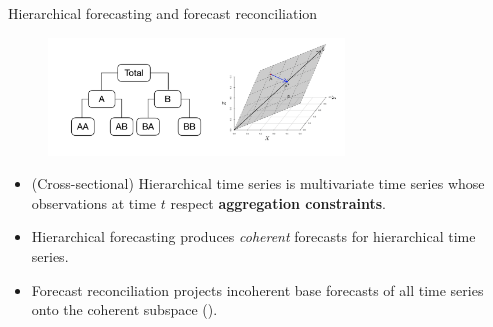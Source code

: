 \documentclass[aspectratio=169]{beamer}
\begin{document}
\begin{frame}{Hierarchical forecasting and forecast reconciliation}
\begin{figure}
    \centering
    \includegraphics[width=0.7\textwidth]{hts.png}    
\end{figure}
\vspace{-0.7cm}
\begin{itemize}
    \item (Cross-sectional) Hierarchical time series is multivariate time series whose observations at time $t$ respect \textbf{aggregation constraints}.
    \item Hierarchical forecasting produces \textit{coherent} forecasts for hierarchical time series.
    \item Forecast reconciliation projects incoherent base forecasts of all time series onto the coherent subspace (\citealp{panagiotelisForecastReconciliationGeometric2021}).
\end{itemize}

\end{frame}
\end{document}

